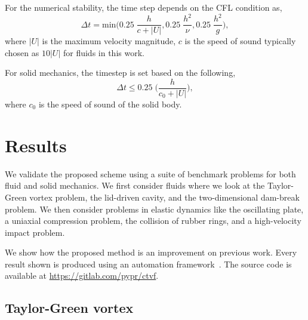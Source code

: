 For the numerical stability, the time step depends on the CFL condition as,
\begin{equation}
  \label{eq:time-step-cfl}
  \Delta t = \mathrm{min} \bigg( 0.25 \; \frac{h}{c + |U|} ,  0.25 \; \frac{h^2}{\nu},  0.25 \; \frac{h^2}{g} \bigg),
\end{equation}
where $|U|$ is the maximum velocity magnitude, $c$ is the speed of sound
typically chosen as $10 |U|$ for fluids in this work.

%
For solid mechanics, the timestep is set based on the following,
\begin{equation}
  \label{eq:time-step-body-force}
  \Delta t \leq 0.25 \; \bigg(\frac{h}{c_0 + |U|} \bigg),
\end{equation}
where $c_0$ is the speed of sound of the solid body.

\section{Results}
\label{sec:results}

We validate the proposed scheme using a suite of benchmark problems for both
fluid and solid mechanics. We first consider fluids where we look at the
Taylor-Green vortex problem, the lid-driven cavity,
and the two-dimensional dam-break problem. We then consider
problems in elastic dynamics like the oscillating plate, a uniaxial
compression problem, the collision of rubber rings, and a high-velocity impact
problem.

We show how the proposed method is an improvement on previous work. Every
result shown is produced using an automation framework~\citep{pr:automan:2018}.
The source code is available at \url{https://gitlab.com/pypr/ctvf}.

\FloatBarrier%

\subsection{Taylor-Green vortex}
\label{sec:tgv}

